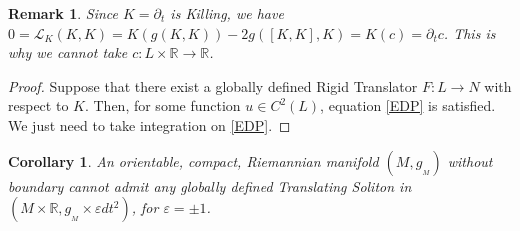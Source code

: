 \documentclass[12pt]{article}
\newtheorem{corollary}[lemma]{Corollary}
\newtheorem{remark}[lemma]{Remark}
\numberwithin{lemma}{section}
\newcommand{\R}{\mathbb{R}}
\newcommand{\ep}{\varepsilon}
\begin{document}
\begin{remark} Since $K=\partial_t$ is Killing, we have $0=\mathcal{L}_{K}(K,K)=K(g(K,K)) -2g([K,K],K) = K(c)=\partial_t c$. This is why we cannot take $c:L\times\mathbb{R}\rightarrow\mathbb{R}$. 
\end{remark}


\begin{proof}
Suppose that there exist a globally defined Rigid Translator $F:L\rightarrow N$ with respect to $K$. Then, for some function $u\in C^2(L)$, equation \eqref{EDP} is satisfied. We just need to take integration on \eqref{EDP}.
\end{proof}
\begin{corollary} An orientable, compact, Riemannian manifold $(M,g_{_M})$ without boundary cannot admit any globally defined Translating Soliton in $(M\times\mathbb{R},g_{_M}\times \varepsilon dt^2)$, for $\varepsilon=\pm 1$. 
\end{corollary}
\end{document}
